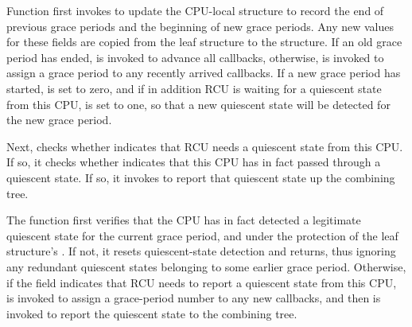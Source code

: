 Function  first invokes 
to update the CPU-local  structure to record the end of
previous grace periods and the beginning of new grace periods.
Any new values for these fields are copied from the leaf 
structure to the  structure.
If an old grace period has ended,  is invoked to
advance all callbacks, otherwise,  is invoked
to assign a grace period to any recently arrived callbacks.
If a new grace period has started,  is set to zero,
and if in addition RCU is waiting for a quiescent state from this CPU,
 is set to one, so that a new quiescent state will
be detected for the new grace period.
%

Next,
 checks whether  indicates
that RCU needs a quiescent state from this CPU.
If so, it checks whether  indicates that this
CPU has in fact passed through a quiescent state.
If so, it invokes  to report that quiescent
state up the %
combining tree.

The  function first verifies that the CPU has
in fact detected a legitimate quiescent state for the current grace period,
and under the protection of the leaf  structure's .
If not, it resets quiescent-state detection and returns, thus ignoring
any redundant quiescent states belonging to some earlier grace period.
Otherwise, if the  field indicates that RCU needs to report a
quiescent state from this CPU,  is invoked to assign
a grace-period number to any new callbacks, and then 
is invoked to report the quiescent state to the  combining tree.

